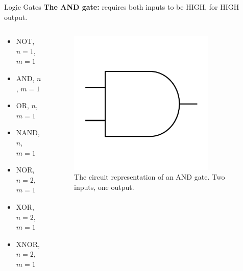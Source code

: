 \documentclass{beamer}
\begin{document}
\begin{frame}{Logic Gates}
\textbf{The AND gate:} requires both inputs to be HIGH, for HIGH output. \\ \vspace{0.5cm}
\begin{columns}[T]
\begin{column}{0.5\textwidth}
\begin{itemize}
\item \alert{NOT, $n=1$, $m=1$}
\item \alert{AND, $n$, $m=1$}
\item OR, $n$, $m=1$
\item NAND, $n$, $m=1$
\item NOR, $n=2$, $m=1$
\item XOR, $n=2$, $m=1$
\item XNOR, $n=2$, $m=1$
\end{itemize}
\end{column}
\begin{column}{0.5\textwidth}
\begin{figure}
\centering
\includegraphics[width=0.8\textwidth,trim=0cm 2cm 0cm 2cm,clip=true]{figures/BasicAND.pdf}
\caption{\label{fig:and} The circuit representation of an AND gate.  Two inputs, one output.}
\end{figure}
\end{column}
\end{columns}
\end{frame}
\end{document}
